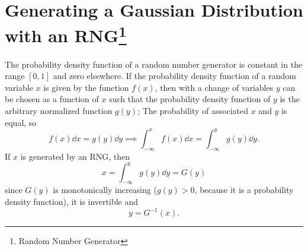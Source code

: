 \documentclass[12pt,a4paper]{article}
\begin{document}
    \section[Generating a Gaussian Distribution with an RNG]
    {Generating a Gaussian Distribution with an RNG\footnote{Random Number Generator}}
    The probability density function of a random number generator is constant in the range $[0,1]$ and zero elsewhere.
    If the probability density function of a random variable $x$ is given by the function $f(x)$, then with a change of
    variables $y$ can be chosen as a function of $x$ such that the probability density function of $y$ is the arbitrary
    normalized function $g(y)$; The probability of associated $x$ and $y$ is equal, so
    \begin{equation}
        f(x)\dd{x} = g(y)\dd{y} \implies \int_{-\infty}^x f(x)\dd{x} = \int_{-\infty}^y g(y)\dd{y}.
    \end{equation}
    If $x$ is generated by an RNG, then
    \begin{equation}
        x = \int_{-\infty}^y g(y)\dd{y} = G(y)
    \end{equation}
    since $G(y)$ is monotonically increasing ($g(y) > 0$, because it is a probability density function),
    it is invertible and
    \begin{equation}
        y = G^{-1}(x).
    \end{equation}
\end{document}
